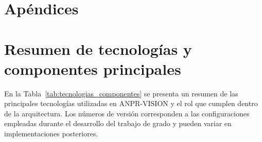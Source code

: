\appendix

\section*{Apéndices}

\section{Resumen de tecnologías y componentes principales}
\label{ap:tecnologias}

En la Tabla~\ref{tab:tecnologias_componentes} se presenta un resumen de las
principales tecnologías utilizadas en ANPR-VISION y el rol que cumplen dentro
de la arquitectura. Los números de versión corresponden a las configuraciones
empleadas durante el desarrollo del trabajo de grado y pueden variar en
implementaciones posteriores.

